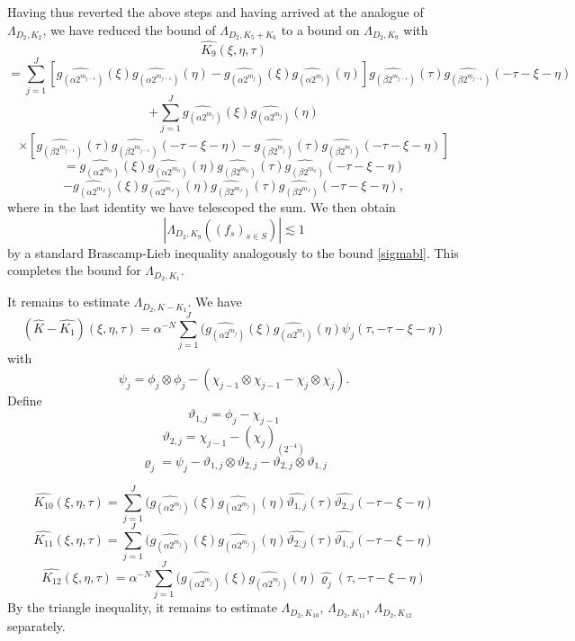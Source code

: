 \documentclass[12pt,reqno]{amsart}
\theoremstyle{plain}
\theoremstyle{definition}
\numberwithin{equation}{section}
\def\wh{\widehat}
\begin{document}
Having thus reverted the above steps and having arrived at 
the analogue of $\Lambda_{D_2,K_2}$, we have 
reduced the bound of $\Lambda_{D_2,K_5+K_6}$ to
a bound on $\Lambda_{D_2,K_9}$ with
\[\widehat{K_9}(\xi,\eta,\tau)  \]
\[= \sum_{j=1}^J \left[\widehat{g_{(\alpha 2^{m_{j-1}})}}(\xi)\widehat{g_{(\alpha 2^{m_{j-1}})}}(\eta) - \widehat{g_{(\alpha 2^{m_j})}}(\xi)\widehat{g_{(\alpha 2^{m_j})}}(\eta)\right] \widehat{g_{(\beta 2^{m_{j-1}})}}(\tau)\widehat{g_{(\beta 2^{m_{j-1}})}}(-\tau-\xi-\eta)   \]
\[+ \sum_{j=1}^J \widehat{g_{(\alpha 2^{m_j})}}(\xi)\widehat{g_{(\alpha 2^{m_j})}}(\eta)  \]
\[\times \left[
\widehat{g_{(\beta 2^{m_{j-1}})}}(\tau)\widehat{g_{(\beta 2^{m_{j-1}})}}(-\tau-\xi-\eta)
-\widehat{g_{(\beta 2^{m_{j}})}}(\tau)\widehat{g_{(\beta 2^{m_{j}})}}(-\tau-\xi-\eta)
\right]\]
\begin{equation*}
=\widehat{g_{(\alpha 2^{m_{0}})}}(\xi)\widehat{g_{(\alpha 2^{m_{0}})}}(\eta)\widehat{g_{(\beta 2^{m_{0}})}}(\tau)\widehat{g_{(\beta 2^{m_{0}})}}(-\tau-\xi-\eta) 
\end{equation*}
\begin{equation*}
-\widehat{g_{(\alpha 2^{m_{J}})}}(\xi)\widehat{g_{(\alpha 2^{m_{J}})}}(\eta)\widehat{g_{(\beta 2^{m_{J}})}}(\tau)\widehat{g_{(\beta 2^{m_{J}})}}(-\tau-\xi-\eta) ,
\end{equation*}
where in the last identity we have telescoped the sum. We then obtain
\[|\Lambda_{D_2,K_9}((f_s)_{s\in S})| \lesssim 1\]
by a standard Brascamp-Lieb inequality analogously to the bound \eqref{sigmabl}.  
This completes the bound for  $\Lambda_{D_2,K_1}$.

It remains to estimate $\Lambda_{D_2,K-K_1}$. We have
\[(\widehat{{K}}-\widehat{K_1})(\xi,\eta,\tau) = \alpha^{-N}\sum_{j=1}^J (\widehat{g_{(\alpha 2^{m_j})}} (\xi)  \widehat{g_{(\alpha 2^{m_j})}}(\eta)   \psi_j(\tau, -\tau-\xi-\eta)\]
with
\[\psi_j=\phi_{j}\otimes \phi_{j}  -({\chi_{j-1}}\otimes {\chi_{j-1}} - {\chi_{j}}\otimes {\chi_{j}}  ). \]
Define
\[{\vartheta_{1,j}}  = \phi_{j} - \chi_{j-1}\]
\[{\vartheta_{2,j}} = \chi_{j-1} - (\chi_{j})_{(2^{-4})} \]
 \[\varrho_j  =\psi_j - \vartheta_{1,j}  \otimes \vartheta_{2,j}
- 
\vartheta_{2,j}  \otimes \vartheta_{1,j}  
\]

\[\widehat{{K}_{10}}(\xi,\eta,\tau) = \sum_{j=1}^J (\widehat{g_{(\alpha 2^{m_j})}} (\xi)  \widehat{g_{(\alpha 2^{m_j})}}(\eta)   \wh{\vartheta_{1,j}}(\tau)\wh{\vartheta_{2,j}}(-\tau-\xi-\eta)\]
\[\widehat{{K}_{11}}(\xi,\eta,\tau) = \sum_{j=1}^J (\widehat{g_{(\alpha 2^{m_j})}} (\xi)  \widehat{g_{(\alpha 2^{m_j})}}(\eta)   \wh{\vartheta_{2,j}}(\tau)\wh{\vartheta_{1,j}}(-\tau-\xi-\eta)\]
\[\widehat{{K}_{12}}(\xi,\eta,\tau) = \alpha^{-N}\sum_{j=1}^J (\widehat{g_{(\alpha 2^{m_j})}} (\xi)  \widehat{g_{(\alpha 2^{m_j})}}(\eta)   \wh{\varrho_j}(\tau, -\tau-\xi-\eta)\]
By the triangle inequality, it remains to estimate 
$\Lambda_{D_2,K_{10}}$, $\Lambda_{D_2,K_{11}}$, $\Lambda_{D_2,K_{12}}$
separately.
\end{document}
